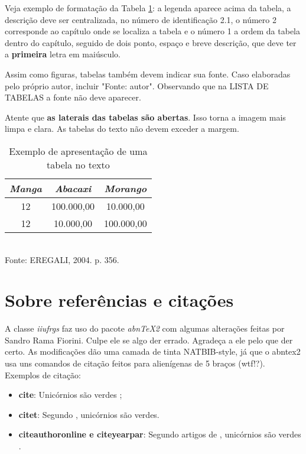 \documentclass[rel_mlp]{iiufrgs}
\newcommand{\fonte}[1]{\\Fonte: {#1}}
\begin{document}
Veja exemplo de formatação da Tabela \ref{tab:tabela2}: a legenda aparece acima da tabela, a descrição deve ser centralizada, no número de identificação 2.1, o número 2 corresponde ao capítulo onde se localiza a tabela e o número 1 a ordem da tabela dentro do capítulo, seguido de dois ponto, espaço e  breve descrição, que deve ter a {\bf primeira} letra em maiúsculo. 

Assim como figuras, tabelas também devem indicar sua fonte. Caso elaboradas pelo próprio autor, incluir "Fonte: autor". Observando que na LISTA DE TABELAS a fonte não deve aparecer. 

Atente que {\bf as laterais das tabelas são abertas}. Isso torna a imagem mais limpa e clara. As tabelas do texto não devem exceder a margem.


\begin{table}[ht]
  \caption{Exemplo de apresentação de uma tabela no texto}
  \centering
    \begin{tabular}{ c | c | c }
        \hline 
        \textit{Manga} & 
        \textit{Abacaxi} &  
        \textit{Morango}  \\
        \hline
        12    & 100.000,00     & 10.000,00 \\
        \hline
        12    & 10.000,00     & 100.000,00 \\
      \hline
    \end{tabular}
   \fonte{EREGALI, 2004. p. 356.}
  \label{tab:tabela2}
\end{table}



%
\chapter{Sobre referências e citações}

A classe \emph{iiufrgs} faz uso do pacote \emph{abnTeX2} com algumas alterações
feitas por Sandro Rama Fiorini. Culpe ele se algo der errado. Agradeça a ele
pelo que der certo. As modificações dão uma camada de tinta NATBIB-style,
já que o abntex2 usa uns comandos de citação feitos para alienígenas de 5 braços (wtf!?). \\

Exemplos de citação:
\begin{itemize}[leftmargin=3em]

\setlength{\itemindent}{1em}

 \item \textbf{cite}: Unicórnios são verdes \cite{Adams2009Conceptual};
    
 \item \textbf{citet}: Segundo \citet{Adams2009Conceptual}, unicórnios são verdes.
    
 \item \textbf{citeauthoronline e citeyearpar}: Segundo artigos de , unicórnios são verdes \citeyearpar{Adams2009Conceptual}.
    
\end{itemize}
 
\end{document}
